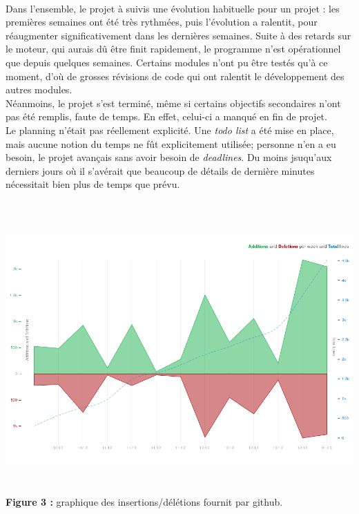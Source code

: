 \documentclass{report}
\begin{document}
    \paragraph*{} %
    Dans l'ensemble, le projet à suivis une évolution habituelle pour un projet : les premières semaines ont été très rythmées, puis l'évolution a ralentit, 
        pour réaugmenter significativement dans les dernières semaines. Suite à des retards sur le moteur, qui aurais dû être finit rapidement, le programme n'est opérationnel que depuis
        quelques semaines. Certains modules n'ont pu être testés qu'à ce moment, d'où de grosses révisions de code qui ont ralentit le développement des autres modules. \\
        Néanmoins, le projet s'est terminé, même si certains objectifs secondaires n'ont pas été remplis, faute de temps. En effet, celui-ci a manqué en fin de projet. \\
        Le planning n'était pas réellement explicité. Une \textit{todo list} a été mise en place, mais aucune notion du temps ne fût explicitement utilisée; personne n'en a eu besoin, 
        le projet avançais sans avoir besoin de \textit{deadlines}. Du moins jsuqu'aux derniers jours où il s'avérait que beaucoup de détails de dernière minutes nécessitait bien
            plus de temps que prévu.
    \paragraph*{} %
        \begin{center}
            \includegraphics[width=15cm, height=11cm]{ressources/rapport/commit.png} \\
            \textbf{Figure 3 :} graphique des insertions/délétions fournit par github.
        \end{center}
        \newpage
\end{document}
